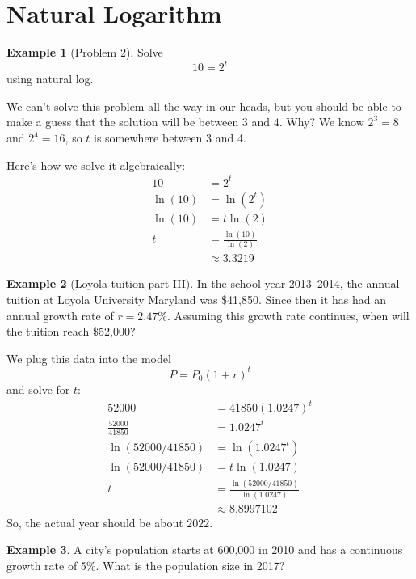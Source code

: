 \documentclass[oneside]{book}
\theoremstyle{definition}
\newtheorem{example}{Example}
\theoremstyle{solution}
\newtheorem*{solution}{Solution}
\newenvironment{solution}{\vspace{2in}\comment}{\endcomment}
\begin{document}
\section{Natural Logarithm}

\begin{example}[Problem 2]
Solve 
$$
10 = 2^t
$$
using natural log.
\end{example}

\begin{solution}
  We can't solve this problem all the way in our heads, but you should
  be able to make a guess that the solution will be between $3$ and
  $4$.  Why? We know $2^3 = 8$ and $2^4 = 16$, so $t$ is somewhere
  between 3 and 4.

Here's how we solve it algebraically:
\begin{align*}
 10 & = 2^t\\
\ln(10) & = \ln(2^t) \\
\ln(10) & = t\ln(2) \\
t & = \frac{\ln(10)}{\ln(2)}\\
 &  \approx 3.3219 
\end{align*}
\end{solution}



\begin{example}[Loyola tuition part III]
In the school year 2013--2014, the annual tuition at Loyola University
Maryland was \$41,850.  Since then it has had an annual growth rate of
$r=2.47\%$.  Assuming this growth rate continues, when will the
tuition reach \$52,000?
\end{example}

\begin{solution}
We plug this data into the model
$$
P = P_0 (1+r)^t
$$  
and solve for $t$:
\begin{align*}
  52000  & = 41850 (1.0247)^t \\
  \frac{52000}{41850} & = 1.0247^t \\
  \ln(52000/41850) & = \ln \left(1.0247^t\right)\\
  \ln(52000/41850) & = t\ln(1.0247)\\
 t  & = \frac{\ln(52000/41850)}{\ln(1.0247)} \\
& \approx 8.8997102
\end{align*}
So, the actual year should be about $2022$.  
\end{solution}


\begin{example}
A city's population starts at 600,000 in 2010 and has a continuous
growth rate of 5\%.  What is the population size in 2017?  
\end{example}
\end{document}
